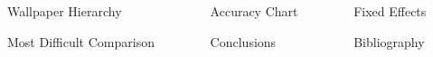 \documentclass[final,hyperref={pdfpagelabels=false}]{beamer}
\begin{document}
\begin{frame}{}
\begin{columns}[t]
    \end{columns}
    \begin{columns}[t]
       \begin{column}{.31\linewidth}
       \begin{block}{Wallpaper Hierarchy}
               	      		 	
               	       		\end{block}
               	       		\begin{block}{Most Difficult Comparison}
               	       		      			
               	       		      		\end{block}
       \end{column}
       	\begin{column}{.35\linewidth}
       		\begin{block}{Accuracy Chart}
      			      			
      		\end{block}
      		
      			\begin{block}{Conclusions}
      		     			
      		     		\end{block}
      		     	
       	\end{column}
       	\begin{column}{.30\linewidth}
      		\begin{block}{Fixed Effects}
   						
     		\end{block}
     			\begin{block}{Bibliography}
     		      		     			
     		      		     			\renewcommand*{\bibliographytypesize}{\small}
     		      		     			
     		      		     		\end{block}
     	
     	\end{column}
    \end{columns}
  \end{frame}
\end{document}
